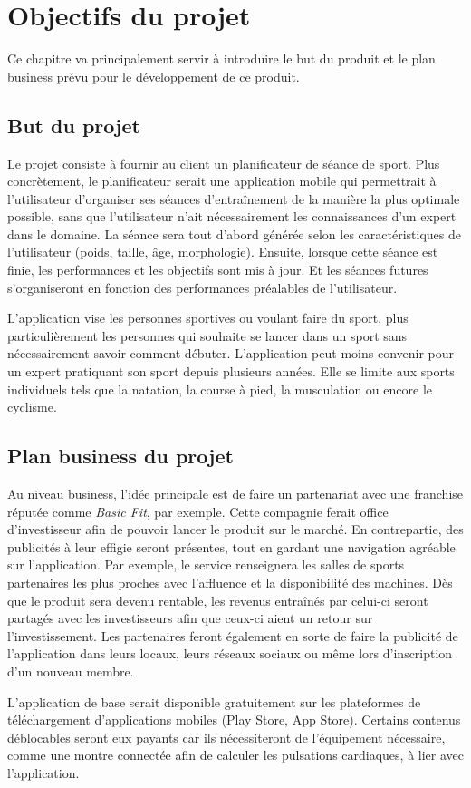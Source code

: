 \chapter{Objectifs du projet}

Ce chapitre va principalement servir à introduire le but du produit et le plan business prévu pour le développement de ce produit.

\section{But du projet}

Le projet consiste à fournir au client un planificateur de séance de sport. Plus concrètement, le planificateur serait une application mobile qui permettrait à l'utilisateur d'organiser ses séances d'entraînement de la manière la plus optimale possible, sans que l'utilisateur n'ait nécessairement les connaissances d'un expert dans le domaine. La séance sera tout d'abord générée selon les caractéristiques de l'utilisateur (poids, taille, âge, morphologie). Ensuite, lorsque cette séance est finie, les performances et les objectifs sont mis à jour. Et les séances futures s'organiseront en fonction des performances préalables de l'utilisateur. 

L'application vise les personnes sportives ou voulant faire du sport, plus particulièrement les personnes qui souhaite se lancer dans un sport sans nécessairement savoir comment débuter. L'application peut moins convenir pour un expert pratiquant son sport depuis plusieurs années. Elle se limite aux sports individuels tels que la natation, la course à pied, la musculation ou encore le cyclisme. 

\section{Plan business du projet}

Au niveau business, l'idée principale est de faire un partenariat avec une franchise réputée comme \textit{Basic Fit}, par exemple. Cette compagnie ferait office d'investisseur afin de pouvoir lancer le produit sur le marché. En contrepartie, des publicités à leur effigie seront présentes, tout en gardant une navigation agréable sur l'application. Par exemple, le service renseignera les salles de sports partenaires les plus proches avec l'affluence et la disponibilité des machines. Dès que le produit sera devenu rentable, les revenus entraînés par celui-ci seront partagés avec les investisseurs afin que ceux-ci aient un retour sur l'investissement. Les partenaires feront également en sorte de faire la publicité de l'application dans leurs locaux, leurs réseaux sociaux ou même lors d'inscription d'un nouveau membre.

L'application de base serait disponible gratuitement sur les plateformes de téléchargement d'applications mobiles (Play Store, App Store). Certains contenus déblocables seront eux payants car ils nécessiteront de l'équipement nécessaire, comme une montre connectée afin de calculer les pulsations cardiaques, à lier avec l'application.